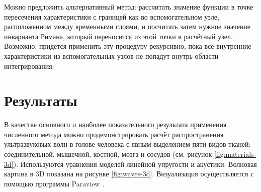 Можно предложить альтернативный метод: рассчитать значение функции в точке пересечения 
характеристики с границей как во вспомогательном узле, 
расположенном между временными слоями, и посчитать затем нужное значение 
инварианта Римана, который переносится из этой точки в расчётный узел. 
Возможно, придётся применить эту процедуру рекурсивно, 
пока все внутренние характеристики из вспомогательных узлов не попадут внутрь 
области интегрирования. 


\section{Результаты}
В качестве основного и наиболее показательного результата применения численного метода можно 
продемонстрировать расчёт распространения ультразвуковых волн в голове человека 
с явным выделением пяти видов тканей: соединительной, мышечной, костной, мозга 
и сосудов (см. рисунок \ref{fig:materials-3d}). 
Используются уравнения моделей линейной упругости и акустики. 
Волновая картина в 3D показана на рисунке 
\ref{fig:waves-3d}. Визуализация осуществляется с помощью программы Paraview \cite{paraview}. 

